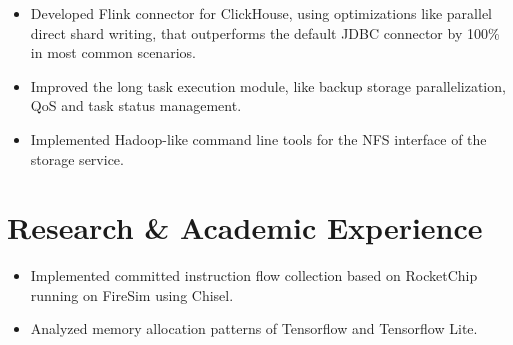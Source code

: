 \documentclass{resume}
\newcommand{\en}[1]{#1}
\newcommand{\zh}[1]{}
\begin{document}
\en{}
\zh{\datedsubsection{\textbf{\href{https://www.aliyun.com/}{阿里云计算有限公司（Alibaba Cloud）}}}{2020/07 -- 2020/08}}
\en{}
\zh{\role{OLAP 产品部}{研发实习}}
\begin{itemize}
      \item \en{Developed Flink connector for ClickHouse, using optimizations like parallel direct shard writing, that outperforms the default JDBC connector by 100\% in most common scenarios.}
            \zh{为 ClickHouse 开发了 Flink connector，应用了直写 local 表等优化，在大部分场景下相较默认 JDBC connector 提升写入性能约 100\%。}
\end{itemize}

\en{}
\zh{\datedsubsection{\textbf{\href{https://www.smartx.com/}{北京志凌海纳科技有限公司（SmartX Inc.）}}}{2019/09 -- 2020/01}}
\en{}
\zh{\role{分布式存储系统(ZBS)}{C++研发实习}}
\begin{itemize}
      \item \en{Improved the long task execution module, like backup storage parallelization, QoS and task status management.}
            \zh{改进了 ZBS 的长任务执行模块（Task Center），如支持备份存储过程批并行化、QoS 限速及任务的状态控制等。}
      \item \en{Implemented Hadoop-like command line tools for the NFS interface of the storage service.}
            \zh{为存储服务的 NFS 接口实现了一整套类似于 Hadoop HDFS 的命令行工具。}
\end{itemize}

\section{\en{Research \& Academic Experience}\zh{研究经历}}
\en{}
\zh{\datedsubsection{\textbf{清华大学网络大数据技术研究中心}}{2020/02 -- 2020/07}}
\en{}
\zh{\role{RISC-V 可信执行环境}{科研实习}}
\begin{itemize}
      \item \en{Implemented committed instruction flow collection based on RocketChip running on FireSim using Chisel.}
            \zh{使用 Chisel 语言，实现了 FireSim 上基于 RocketChip 的指令流收集。}
      \item \en{Analyzed memory allocation patterns of Tensorflow and Tensorflow Lite.}
            \zh{分析了 Tensorflow 与 Tensorflow Lite 框架内存分配的特征。}
\end{itemize}
\end{document}
